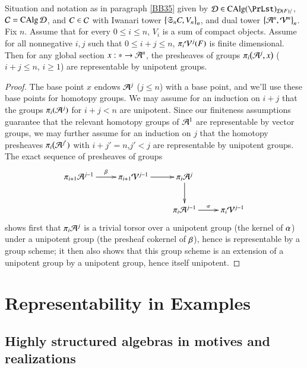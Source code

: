\begin{ssProposition}
\label{KK61}

Situation and notation as in paragraph \ref{BB35} given by $\Dd \in \CAlg (\PrLst)_{\Dd(F)/}$, $\mathcal{C} = \operatorname{CAlg} \mathcal{D}$, and $C \in \mathcal{C}$ with Iwanari tower $\big\{\mathfrak{S}_n C, V_n \big\}_n$, and dual tower $\big\{\mathcal{A}^n, \mathcal{V}^n\big\}_n$. Fix $n$. Assume that for every $0 \le i \le n$, $V_i$ is a sum of compact objects. Assume for all nonnegative $i,j$ such that $0 \le i+j \le n$, $\pi_i\mathcal{V}^j(F)$ is finite dimensional. Then for any global section $x: \ast \to \mathcal{A}^n$, the presheaves of groups $\pi_i \big( \mathcal{A}^j, x \big)$ ($i+j \le n$, $i \ge 1$) are representable by unipotent groups. 
\end{ssProposition}

\begin{proof}
The base point $x$ endows $\mathcal{A}^{j}$ ($j \le n$) with a base point, and we'll use these base points for homotopy groups. We may assume for an induction on $i+j$ that the groups $\pi_i(\mathcal{A}^j)$ for $i+j < n$ are unipotent. Since our finiteness assumptions guarantee that the relevant homotopy groups of $\mathcal{A}^1$ are representable by vector groups, we may further assume for an induction on $j$ that the homotopy presheaves $\pi_i \big( \mathcal{A}^{j'})$ with $i+j' = n$,$j'<j $ are representable by unipotent groups. The exact sequence of presheaves of groups
\[
\xymatrix{
\pi_{i+1} \Aa^{j-1} \ar[r]^-\be &
\pi_{i+1} \Vv^{j-1} \ar[r] &
\pi_{i} \Aa^{j} \ar[d]
\\
&&
\pi_{i} \Aa^{j-1} \ar[r]^-\al &
\pi_{i} \Vv^{j-1}
}
\]
shows first that $\pi_{i} \mathcal{A}^{j}$ is a trivial torsor over a unipotent group (the kernel of $\alpha$) under a unipotent group (the presheaf cokernel of $\beta$), hence is representable by a group scheme; it then also shows that this group scheme is an extension of a unipotent group by a unipotent group, hence itself unipotent. 
\end{proof}


\section{Representability in Examples}
\label{Sec:RepEx}


\subsection{Highly structured algebras in motives and realizations}
\label{sSec:Rev}


